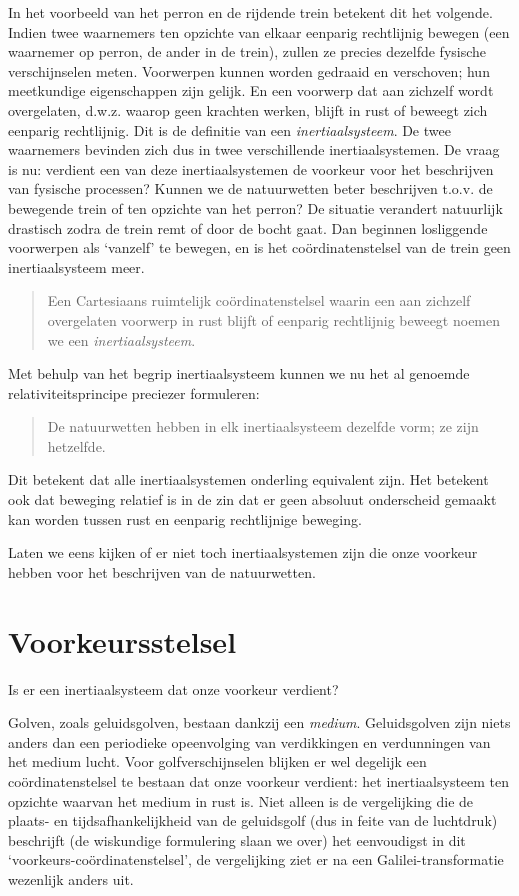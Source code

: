 In het voorbeeld van het perron en de rijdende trein betekent dit het
volgende. Indien twee waarnemers ten opzichte van elkaar
eenparig rechtlijnig bewegen (een waarnemer op perron, de ander in de
trein), zullen ze precies dezelfde fysische verschijnselen
meten. Voorwerpen kunnen worden gedraaid en verschoven; hun meetkundige
eigenschappen zijn gelijk. En een voorwerp dat aan zichzelf wordt
overgelaten, d.w.z. waarop geen krachten werken, blijft in rust of beweegt
zich eenparig rechtlijnig. Dit is de definitie van een {\em
  inertiaalsysteem}. De twee waarnemers bevinden zich dus in twee
verschillende inertiaalsystemen. De vraag is nu: verdient een van deze
inertiaalsystemen de voorkeur voor het beschrijven van fysische
processen? Kunnen we de natuurwetten beter beschrijven t.o.v. de
bewegende trein of ten opzichte van het perron? 
De situatie verandert natuurlijk drastisch zodra de trein remt of door
de bocht gaat. Dan beginnen losliggende voorwerpen als `vanzelf' te
bewegen, en is het co\"ordinatenstelsel van de trein geen
inertiaalsysteem meer.

\begin{quote}
Een Cartesiaans ruimtelijk co\"ordinatenstelsel waarin een aan
zichzelf overgelaten voorwerp in rust blijft of eenparig rechtlijnig
beweegt noemen we een {\it inertiaalsysteem}.
\end{quote}
Met behulp van het begrip inertiaalsysteem kunnen we nu het al genoemde relativiteitsprincipe preciezer formuleren:
\begin{quote}
De natuurwetten hebben in elk inertiaalsysteem dezelfde vorm; ze zijn hetzelfde.
\end{quote}
Dit betekent dat alle inertiaalsystemen onderling equivalent zijn. Het betekent ook dat beweging relatief is in de zin dat er geen absoluut onderscheid gemaakt kan worden tussen rust en eenparig rechtlijnige beweging.


Laten we eens kijken of er niet toch inertiaalsystemen zijn die onze
voorkeur hebben voor het beschrijven van de natuurwetten.

\section{Voorkeursstelsel}
Is er een inertiaalsysteem dat onze voorkeur verdient?

Golven, zoals geluidsgolven, bestaan dankzij een {\sl medium}.
Geluidsgolven zijn niets anders dan een periodieke opeenvolging van
verdikkingen en verdunningen van het medium lucht.  Voor
golfverschijnselen blijken er wel degelijk een co\"{o}rdinatenstelsel
te bestaan dat onze voorkeur verdient: het inertiaalsysteem ten
opzichte waarvan het medium in rust is.  Niet alleen is de
vergelijking die de plaats- en tijdsafhankelijkheid van de geluidsgolf
(dus in feite van de luchtdruk) beschrijft (de wiskundige formulering
slaan we over) het eenvoudigst in dit
`voorkeurs-co\"{o}rdinatenstelsel', de vergelijking ziet er na een
Galilei-transformatie wezenlijk anders uit.

